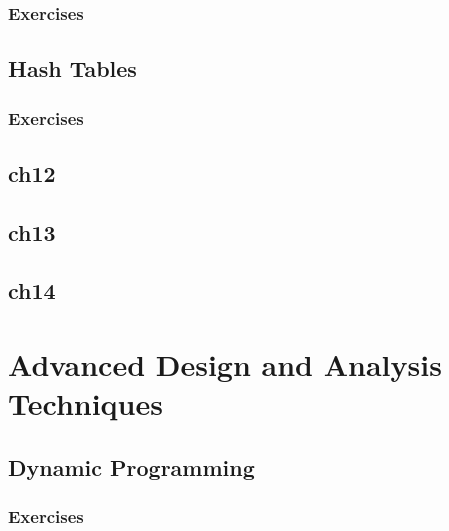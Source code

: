\documentclass[a4paper, 11pt, fleqn]{report}
\begin{document}
            \section*{Exercises}
        \chapter{Hash Tables}
            \section*{Exercises}
                
                
        \chapter{ch12}
        \chapter{ch13}
        \chapter{ch14}
    \part{Advanced Design and Analysis Techniques}
        \chapter{Dynamic Programming}
            \section*{Exercises}
                
\end{document}
